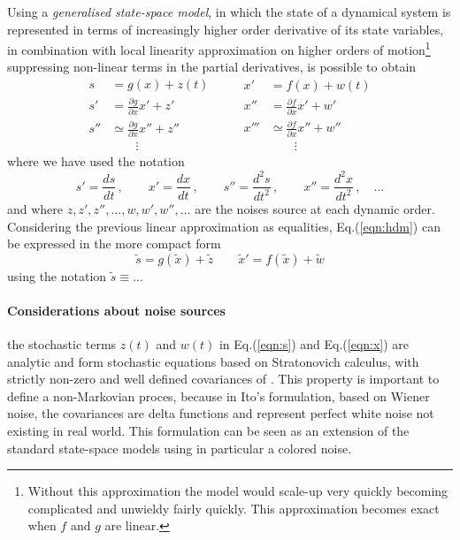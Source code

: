 \documentclass[a4paper, 10pt]{article}
\begin{document}
Using a \emph{generalised state-space model}, in which the state of a dynamical system is represented in terms of increasingly higher order derivative of its state variables, in combination with local linearity approximation on higher orders of motion\footnote{Without this approximation the model would scale-up very quickly becoming complicated and unwieldy fairly quickly. This approximation becomes exact when $f$ and $g$ are linear.} suppressing non-linear terms in the partial derivatives, is possible to obtain 
\begin{equation}
  \begin{split}
    s &= g(x) + z(t) \\
    s' &= \frac{\partial g}{\partial x}x' + z' \\
    s'' & \simeq \frac{\partial g}{\partial x}x'' + z''\\
    				& \qquad \vdots
  \end{split}
  \qquad
  \begin{split}
    x' &= f(x) + w(t) \\
    x'' &= \frac{\partial f}{\partial x}x' + w' \\
    x''' & \simeq \frac{\partial f}{\partial x}x'' + w''\\
    				& \qquad \vdots
  \end{split}
\label{eqn:hdm}
\end{equation}
where we have used the notation
\begin{equation}
s' = \frac{ds}{dt} \, , \qquad x'=\frac{dx}{dt} \, , \qquad s''= \frac{d^2 s}{dt^2} \, , \qquad x''= \frac{d^2 x}{dt^2} \, , \quad \dots
\end{equation}
and where $z,z',z'',\dots, w,w',w'',\dots$ are the noises source at each dynamic order.
Considering the previous linear approximation as equalities, Eq.(\ref{eqn:hdm}) can be expressed in the more compact form
\begin{equation}
\tilde{s} = g(\tilde{x}) + \tilde{z} \qquad \tilde{x}' = f(\tilde{x}) + \tilde{w}
\end{equation}
using the notation $\tilde{s} \equiv \dots$
\paragraph{Considerations about noise sources}
the stochastic terms $z(t)$ and $w(t)$ in Eq.(\ref{eqn:s}) and Eq.(\ref{eqn:x}) are analytic and form stochastic equations based on Stratonovich calculus, with strictly non-zero and well defined covariances of . This property is important to define a non-Markovian proces, because in Ito's formulation, based on Wiener noise, the covariances are delta functions and represent perfect white noise not existing in real world. This formulation can be seen as an extension of the standard state-space models using in particular a colored noise.
\end{document}
